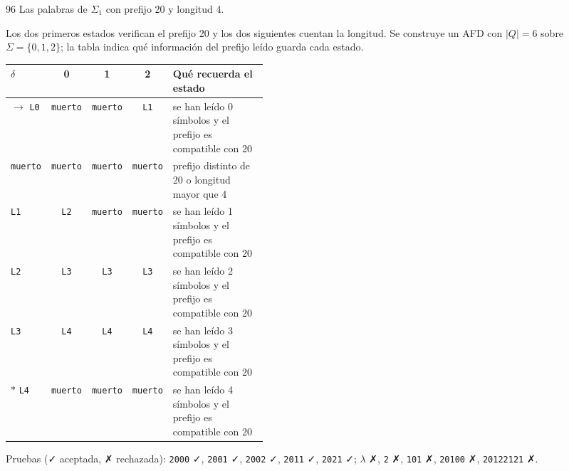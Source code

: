 \documentclass[11pt]{article}
\begin{document}
\begin{ejercicio}{96}{}
Las palabras de $\Sigma_1$ con prefijo 20 y longitud 4.
\end{ejercicio}
\proc Los dos primeros estados verifican el prefijo 20 y los dos siguientes cuentan la longitud. Se construye un AFD con $|Q| = 6$ sobre $\Sigma = \{0, 1, 2\}$; la tabla indica qué información del prefijo leído guarda cada estado.
\begin{center}\small\begin{tabular}{lcccp{0.42\linewidth}}\toprule
$\delta$ & 0 & 1 & 2 & Qué recuerda el estado \\\midrule
$\to$ \texttt{L0} & \texttt{muerto} & \texttt{muerto} & \texttt{L1} & se han leído 0 símbolos y el prefijo es compatible con 20 \\
 \texttt{muerto} & \texttt{muerto} & \texttt{muerto} & \texttt{muerto} & prefijo distinto de 20 o longitud mayor que 4 \\
 \texttt{L1} & \texttt{L2} & \texttt{muerto} & \texttt{muerto} & se han leído 1 símbolos y el prefijo es compatible con 20 \\
 \texttt{L2} & \texttt{L3} & \texttt{L3} & \texttt{L3} & se han leído 2 símbolos y el prefijo es compatible con 20 \\
 \texttt{L3} & \texttt{L4} & \texttt{L4} & \texttt{L4} & se han leído 3 símbolos y el prefijo es compatible con 20 \\
$*$ \texttt{L4} & \texttt{muerto} & \texttt{muerto} & \texttt{muerto} & se han leído 4 símbolos y el prefijo es compatible con 20 \\
\bottomrule\end{tabular}\end{center}
Pruebas (✓ aceptada, ✗ rechazada): \texttt{2000} ✓, \texttt{2001} ✓, \texttt{2002} ✓, \texttt{2011} ✓, \texttt{2021} ✓; $\lambda$ ✗, \texttt{2} ✗, \texttt{101} ✗, \texttt{20100} ✗, \texttt{20122121} ✗.
\end{document}
